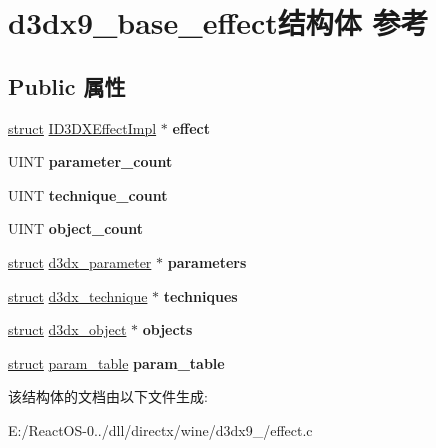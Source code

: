 \hypertarget{structd3dx9__base__effect}{}\section{d3dx9\+\_\+base\+\_\+effect结构体 参考}
\label{structd3dx9__base__effect}
\subsection*{Public 属性}
\begin{DoxyCompactItemize}
\item 
\mbox{\label{structd3dx9__base__effect_aa1e305059681be61f83ceec794d2d7c1}} 
\hyperlink{interfacestruct}{struct} \hyperlink{struct_i_d3_d_x_effect_impl}{I\+D3\+D\+X\+Effect\+Impl} $\ast$ {\bfseries effect}
\item 
\mbox{\label{structd3dx9__base__effect_a81b0e86ece167740538f8d1e90d3bb87}} 
U\+I\+NT {\bfseries parameter\+\_\+count}
\item 
\mbox{\label{structd3dx9__base__effect_aab186ac5010c9f04a25a150be1584e00}} 
U\+I\+NT {\bfseries technique\+\_\+count}
\item 
\mbox{\label{structd3dx9__base__effect_a61cebb49ca88fb1613cd4fb5e7a3c24b}} 
U\+I\+NT {\bfseries object\+\_\+count}
\item 
\mbox{\label{structd3dx9__base__effect_a83b392d87ef5247ddfd47e7366840ee3}} 
\hyperlink{interfacestruct}{struct} \hyperlink{structd3dx__parameter}{d3dx\+\_\+parameter} $\ast$ {\bfseries parameters}
\item 
\mbox{\label{structd3dx9__base__effect_a0cd1ba3e489a152fdb97f2de69a2f030}} 
\hyperlink{interfacestruct}{struct} \hyperlink{structd3dx__technique}{d3dx\+\_\+technique} $\ast$ {\bfseries techniques}
\item 
\mbox{\label{structd3dx9__base__effect_a7128a1700fb9d2d9492d9952f7899735}} 
\hyperlink{interfacestruct}{struct} \hyperlink{structd3dx__object}{d3dx\+\_\+object} $\ast$ {\bfseries objects}
\item 
\mbox{\label{structd3dx9__base__effect_ab0fff98f584ac8ab82f10dd1fa4e655b}} 
\hyperlink{interfacestruct}{struct} \hyperlink{structparam__table}{param\+\_\+table} {\bfseries param\+\_\+table}
\end{DoxyCompactItemize}


该结构体的文档由以下文件生成\+:\begin{DoxyCompactItemize}
\item 
E\+:/\+React\+O\+S-\/0../dll/directx/wine/d3dx9\+\_/effect.\+c\end{DoxyCompactItemize}
